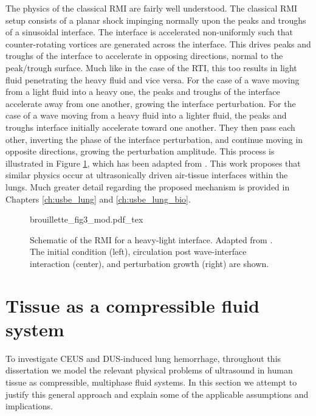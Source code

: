 The physics of the classical \ac{RMI} are fairly well understood. The
classical \ac{RMI} setup consists of a planar shock impinging normally
upon the peaks and troughs of a sinusoidal interface. The interface is
accelerated non-uniformly such that counter-rotating vortices are
generated across the interface. This drives peaks and troughs of the
interface to accelerate in opposing directions, normal to the
peak/trough surface. Much like in the case of the \ac{RTI}, this too
results in light fluid penetrating the heavy fluid and vice versa. For
the case of a wave moving from a light fluid into a heavy one, the
peaks and troughs of the interface accelerate away from one another,
growing the interface perturbation. For the case of a wave moving from
a heavy fluid into a lighter fluid, the peaks and troughs interface
initially accelerate toward one another. They then pass each other,
inverting the phase of the interface perturbation, and continue moving
in opposite directions, growing the perturbation amplitude. This
process is illustrated in Figure \ref{fig:rmi_schematic}, which has
been adapted from \cite{Brouillette2002}. This work proposes that
similar physics occur at ultrasonically driven air-tissue interfaces
within the lungs. Much greater detail regarding the proposed mechanism
is provided in Chapters \ref{ch:usbe_lung} and \ref{ch:usbe_lung_bio}.
\begin{figure}
  \centering
  \def\svgwidth{0.9\textwidth}
  {brouillette_fig3_mod.pdf_tex} \hfill%
  \caption[Schematic of the \acl{RMI} for a heavy-light
  interface]{Schematic of the \acl{RMI} for a heavy-light
    interface. Adapted from \cite{Brouillette2002}. The initial
    condition (left), circulation post wave-interface interaction
    (center), and perturbation growth (right) are shown.}
  \label{fig:rmi_schematic}
\end{figure}


\section{Tissue as a compressible fluid system}
To investigate \ac{CEUS} and \ac{DUS}-induced lung hemorrhage,
throughout this dissertation we model the relevant physical
problems of ultrasound in human tissue as compressible, multiphase
fluid systems. In this section we attempt to justify this general
approach and explain some of the applicable assumptions and
implications.

